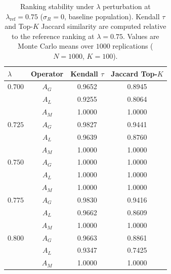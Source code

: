\begin{table}[H]
\caption{Ranking stability under $\lambda$ perturbation at $\lambda_{\mathrm{ref}}=0.75$ ($\sigma_R=0$, baseline population). Kendall $\tau$ and Top-$K$ Jaccard similarity are computed relative to the reference ranking at $\lambda=0.75$. Values are Monte Carlo means over $1000$ replications ($N=1000$, $K=100$).}
\label{tab:lambda-stability}
\centering\small\renewcommand{\arraystretch}{1.2}
\begin{tabular}{lccc}
\toprule
$\lambda$ & Operator & Kendall $\tau$ & Jaccard Top-$K$ \\
\midrule
$0.700$ & $A_G$ & 0.9652 & 0.8945 \\
 & $A_L$ & 0.9255 & 0.8064 \\
 & $A_M$ & 1.0000 & 1.0000 \\
\midrule
$0.725$ & $A_G$ & 0.9827 & 0.9441 \\
 & $A_L$ & 0.9639 & 0.8760 \\
 & $A_M$ & 1.0000 & 1.0000 \\
\midrule
$0.750$ & $A_G$ & 1.0000 & 1.0000 \\
 & $A_L$ & 1.0000 & 1.0000 \\
 & $A_M$ & 1.0000 & 1.0000 \\
\midrule
$0.775$ & $A_G$ & 0.9830 & 0.9416 \\
 & $A_L$ & 0.9662 & 0.8609 \\
 & $A_M$ & 1.0000 & 1.0000 \\
\midrule
$0.800$ & $A_G$ & 0.9663 & 0.8861 \\
 & $A_L$ & 0.9347 & 0.7425 \\
 & $A_M$ & 1.0000 & 1.0000 \\
\bottomrule
\end{tabular}
\end{table}
